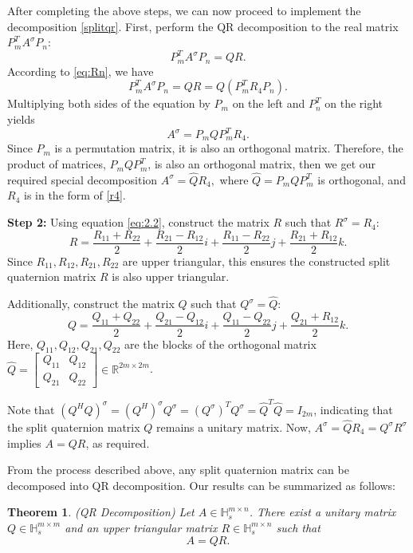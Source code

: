 \documentclass[12pt]{article}
\newtheorem{theorem}{Theorem}[section]
\numberwithin{equation}{section} %
\begin{document}
After completing the above steps, we can now proceed to implement the decomposition \eqref{splitqr}.
First, perform the QR decomposition to the real matrix $P_m^TA^\sigma P_{n}$:
\[P_m^TA^\sigma P_n = QR.\]
According to \eqref{eq:Rn}, we have
\[P_m^TA^\sigma P_n = QR = Q(P_m^TR_4P_n).\]
Multiplying both sides of the equation by $P_m$ on the left and $P_n^T$ on the right yields
\[A^\sigma=P_mQP_m^T R_4.\]
Since $P_m$ is a permutation matrix, it is also an orthogonal matrix. Therefore, the product of matrices, $P_mQP_m^T$, is also an orthogonal matrix, then we get our required special decomposition $A^\sigma=\hat{Q}R_4,$ where $\hat{Q}=P_mQP_m^T$ is orthogonal, and $R_4$ is in the form of \eqref{r4}.


\textbf{Step 2:} Using equation \eqref{eq:2.2}, construct the matrix $R$ such that $R^\sigma=R_4:$
$$
R = \frac{R_{11} + R_{22}}{2} + \frac{R_{21} - R_{12}}{2}i + \frac{R_{11} - R_{22}}{2}j + \frac{R_{21} + R_{12}}{2}k.
$$
Since $R_{11}, R_{12}, R_{21}, R_{22}$ are upper triangular, this ensures the constructed split quaternion matrix $R$ is also upper triangular.


Additionally, construct the matrix $Q$ such that $Q^\sigma=\hat{Q}:$
$$
Q = \frac{Q_{11} + Q_{22}}{2} + \frac{Q_{21} - Q_{12}}{2}i + \frac{Q_{11} - Q_{22}}{2}j + \frac{Q_{21} + R_{12}}{2}k.
$$
Here,  $Q_{11}, 
 Q_{12}, Q_{21}, Q_{22}$ are the blocks of the orthogonal matrix $\hat{Q} = \begin{bmatrix} Q_{11} & Q_{12} \\ Q_{21} & Q_{22} \end{bmatrix} \in \mathbb{
 R}^{2m \times 2m}$.

Note that $(Q^H Q)^\sigma = {(Q^H)}^\sigma Q^\sigma = {(Q^\sigma)}^TQ^\sigma = \hat{Q}^T\hat{Q} = I_{2m}$, indicating that the split quaternion matrix $Q$ remains a unitary matrix.
Now, $A^\sigma=\hat{Q}R_4=Q^\sigma R^\sigma$ implies
$A = Q R$, as required.

From the process described above,  any split quaternion matrix can be decomposed into QR decomposition. Our results can be summarized as follows:
\begin{theorem}(QR Decomposition)
    Let $A \in \mathbb{H}_s^{m \times n}$. There exist a unitary matrix $Q \in \mathbb{H}_s^{m \times m}$ and an upper triangular matrix $R \in \mathbb{H}_s^{m \times n}$ such that
    \begin{equation}
        A = Q R.\label{eq:split QR}
    \end{equation}
\end{theorem}
\end{document}
